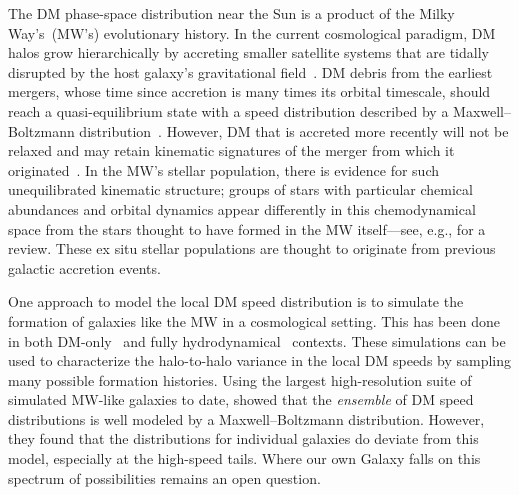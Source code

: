 \documentclass[twocolumn,tighten,twocolappendix]{aastex701}
\begin{document}
The DM phase-space distribution near the Sun is a product of the Milky Way's~(MW's) evolutionary history. In the current cosmological paradigm, DM halos grow hierarchically by accreting smaller satellite systems that are tidally disrupted by the host galaxy's gravitational field~\citep{1978MNRAS.183..341W,2008MNRAS.391.1685S, 2011ApJ...740..102K}. DM debris from the earliest mergers, whose time since accretion is many times its orbital timescale, should reach a quasi-equilibrium state with a speed distribution described by a Maxwell--Boltzmann distribution~\citep{1986PhRvD..33.3495D}. However, DM that is accreted more recently will not be relaxed and may retain kinematic signatures of the merger from which it originated~\citep{2008Natur.454..735D}. In the MW's stellar population, there is evidence for such unequilibrated kinematic structure; groups of stars with particular chemical abundances and orbital dynamics appear differently in this chemodynamical space from the stars thought to have formed in the MW itself---see, e.g., \cite{2020ARA&A..58..205H} for a review. These ex situ stellar populations are thought to originate from previous galactic accretion events.

One approach to model the local DM speed distribution is to simulate the formation of galaxies like the MW in a cosmological setting. This has been done in both DM-only~\citep{2005MNRAS.361L...1W,2006JCAP...01..014H,2008MNRAS.385..236V,2009MNRAS.395..797V,2010JCAP...10..034G,2010JCAP...02..030K,2013MNRAS.430.1722V,2017IJMPA..3230016B} and fully hydrodynamical~\citep{2010JCAP...02..012L,2010MNRAS.406..922T,2014ApJ...784..161P,2016JCAP...05..024B,2016MNRAS.462..663B,2016JCAP...08..071K,2016ApJ...831...93S,2017IJMPA..3230016B,  2020JCAP...07..036B,2020JHEP...07..081H,2020JCAP...11..016P, 2023MNRAS.524.2606L,2023JCAP...05..012N,2024JCAP...08..022S} contexts. These simulations can be used to characterize the halo-to-halo variance in the local DM speeds by sampling many possible formation histories. Using the largest high-resolution suite of simulated MW-like galaxies to date, \cite{2025arXiv250507924F} showed that the \emph{ensemble} of DM speed distributions is well modeled by a Maxwell--Boltzmann distribution.  However, they found that the distributions for individual galaxies do deviate from this model, especially at the high-speed tails. Where our own Galaxy falls on this spectrum of possibilities remains an open question. 
\end{document}
